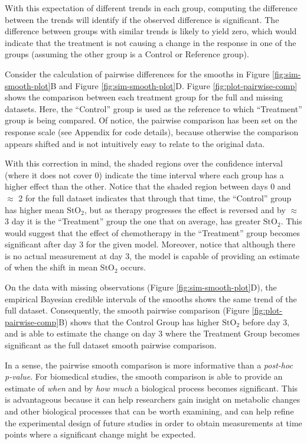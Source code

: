 \documentclass[
]{article}
\begin{document}
With this expectation of different trends in each group, computing the difference between the trends will identify if the observed difference is significant. The difference between groups with similar trends is likely to yield zero, which would indicate that the treatment is not causing a change in the response in one of the groups (assuming the other group is a Control or Reference group).

Consider the calculation of pairwise differences for the smooths in Figure \ref{fig:sim-smooth-plot}B and Figure \ref{fig:sim-smooth-plot}D. Figure \ref{fig:plot-pairwise-comp} shows the comparison between each treatment group for the full and missing datasets. Here, the ``Control'' group is used as the reference to which ``Treatment'' group is being compared. Of notice, the pairwise comparison has been set on the response scale (see Appendix for code details), because otherwise the comparison appears shifted and is not intuitively easy to relate to the original data.

With this correction in mind, the shaded regions over the confidence interval (where it does not cover 0) indicate the time interval where each group has a higher effect than the other. Notice that the shaded region between days 0 and \(\approx\) 2 for the full dataset indicates that through that time, the ``Control'' group has higher mean \(\mbox{StO}_2\), but as therapy progresses the effect is reversed and by \(\approx\) 3 day it is the ``Treatment'' group the one that on average, has greater \(\mbox{StO}_2\). This would suggest that the effect of chemotherapy in the ``Treatment'' group becomes significant after day 3 for the given model. Moreover, notice that although there is no actual measurement at day 3, the model is capable of providing an estimate of when the shift in mean \(\mbox{StO}_2\) occurs.

On the data with missing observations (Figure \ref{fig:sim-smooth-plot}D), the empirical Bayesian credible intervals of the smooths shows the same trend of the full dataset. Consequently, the smooth pairwise comparison (Figure \ref{fig:plot-pairwise-comp}B) shows that the Control Group has higher \(\mbox{StO}_2\) before day 3, and is able to estimate the change on day 3 where the Treatment Group becomes significant as the full dataset smooth pairwise comparison.

In a sense, the pairwise smooth comparison is more informative than a \emph{post-hoc} \emph{p-value}. For biomedical studies, the smooth comparison is able to provide an estimate of \emph{when} and by \emph{how much} a biological process becomes significant. This is advantageous because it can help researchers gain insight on metabolic changes and other biological processes that can be worth examining, and can help refine the experimental design of future studies in order to obtain measurements at time points where a significant change might be expected.
\end{document}
